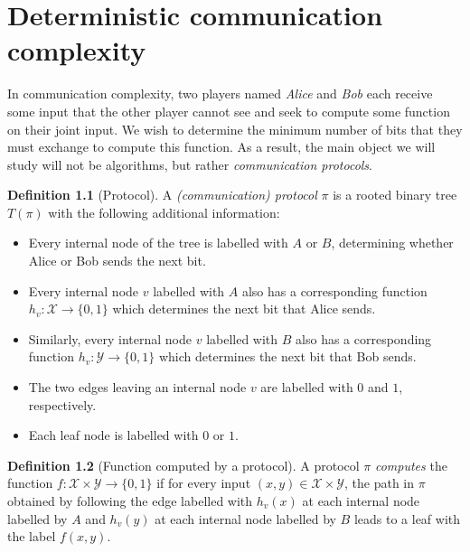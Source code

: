 \documentclass[11pt,oneside]{book}
\theoremstyle{plain}
\theoremstyle{definition}
\newtheorem{definition}{Definition}
\theoremstyle{plain}
\newcommand{\calX}{\mathcal{X}}
\newcommand{\calY}{\mathcal{Y}}
\begin{document}
	


\chapter[CH01]{Deterministic communication complexity}

In communication complexity, two players named \emph{Alice} and \emph{Bob} each receive some input that the other player cannot see and seek to compute some function on their joint input. We wish to determine the minimum number of bits that they must exchange to compute this function. As a result, the main object we will study will not be algorithms, but rather \emph{communication protocols}. 

\newpage

\begin{definition}[Protocol]
	A \emph{(communication) protocol} $\pi$ is a rooted binary tree $T(\pi)$ with the following additional information:
	\begin{itemize}
		\item Every internal node of the tree is labelled with $A$ or $B$, determining whether Alice or Bob sends the next bit.
		\item Every internal node $v$ labelled with $A$ also has a corresponding function $h_v : \calX \to \{0,1\}$ which determines the next bit that Alice sends.
		\item Similarly, every internal node $v$ labelled with $B$ also has a corresponding function $h_v : \calY \to \{0,1\}$ which determines the next bit that Bob sends.
		\item The two edges leaving an internal node $v$ are labelled with $0$ and $1$, respectively.
		\item Each leaf node is labelled with $0$ or $1$.
	\end{itemize}
\end{definition}

\begin{definition}[Function computed by a protocol]
	A protocol $\pi$ \emph{computes} the function $f : \calX \times \calY \to \{0,1\}$ if for every input $(x,y) \in \calX \times \calY$, the path in $\pi$ obtained by following the edge labelled with $h_v(x)$ at each internal node labelled by $A$ and $h_v(y)$ at each internal node labelled by $B$ leads to a leaf with the label $f(x,y)$.
\end{definition}
\end{document}
